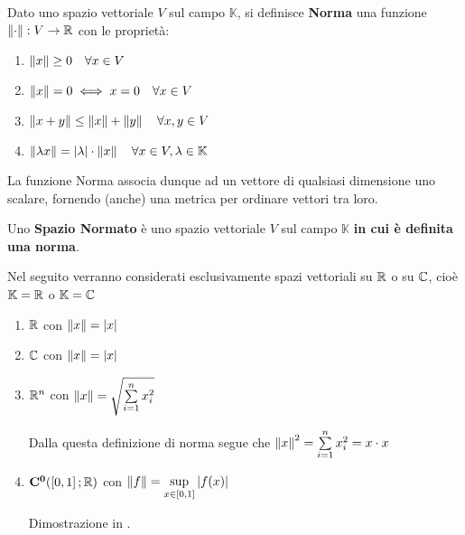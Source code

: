 \begin{definition}[Norma]
	\label{def:norma}
	Dato uno spazio vettoriale $V$ sul campo $\mathbb{K}$, si definisce \textbf{Norma} una funzione $\left\|\cdot\right\|:V \to \mathbb{R}$ con le proprietà:
	\begin{enumerate}
		\item $\left\|x\right\| \geq 0 \quad \forall x\in V$
		\item $\left\|x\right\|=0 \iff x = 0 \quad \forall x\in V$
		\item \label{itm:def_norm_propr_somma} $\left\|x+y\right\| \leq \left\|x\right\|+\left\|y\right\| \quad \forall x,y\in V$
		\item \label{itm:def_norm_propr_lambda} $\left\|\lambda x\right\| = \left|\lambda\right| \cdot \left\|x\right\| \quad \forall x\in V,\lambda\in\mathbb{K}$
	\end{enumerate}
	\begin{note}
		La funzione Norma associa dunque ad un vettore di qualsiasi dimensione uno scalare, fornendo (anche) una metrica per ordinare vettori tra loro.
	\end{note}
\end{definition}
\begin{definition}
	Uno \textbf{Spazio Normato} è uno spazio vettoriale $V$ sul campo $\mathbb{K}$ \textbf{in cui è definita una norma}.
	\begin{note}
		Nel seguito verranno considerati esclusivamente spazi vettoriali su $\mathbb{R}$ o su $\mathbb{C}$, cioè $\mathbb{K} = \mathbb{R}$ o $\mathbb{K} = \mathbb{C}$
	\end{note}
\end{definition}

\begin{example}\leavevmode\vspace*{-\baselineskip}
	\label{ex:sp_norm}
	\begin{enumerate}
		\item $\mathbb{R}$ con $\left\|x\right\| = \left|x\right|$
		\item $\mathbb{C}$ con $\left\|x\right\| = \left|x\right|$
		\item \label{itm:ex_sp_norm_Rn} $\mathbb{R}^n$ con $\left\|x\right\| = \sqrt{\sum\limits_{i=1}^{n}x_i^2}$
			\begin{note}
				\hypertarget{note:ex_sp_norm_Rn}{}
				Dalla questa definizione di norma segue che $\left\|x\right\|^2 = \sum\limits_{i=1}^{n}x_i^2 = x \cdot x$
			\end{note}
		\item $\mathbf{C^{0}}(\left[0,1\right];\mathbb{R})$ con $\left\|f\right\| = \sup\limits_{x \in \left[0,1\right]} \left|f(x)\right|$
			\begin{note}
				Dimostrazione in .
			\end{note}
	\end{enumerate}
\end{example}

